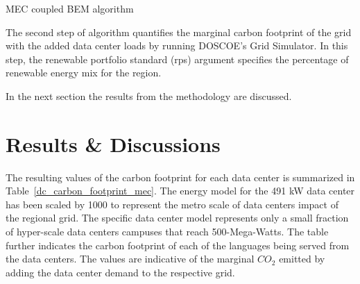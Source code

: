   \begin{algorithm}
    \begin{small}
    \caption{MEC coupled BEM algorithm}
    \label{Service Profile}
  \end{small}
  \end{algorithm}

  The second step of algorithm quantifies the marginal carbon footprint of the grid with the added data center loads by running DOSCOE’s Grid Simulator. In this step, the renewable portfolio standard (rps) argument specifies the percentage of renewable energy mix for the region.  

  In the next section the results from the methodology are discussed. 


\section{Results \& Discussions}
The resulting values of the carbon footprint for each data center is summarized in Table~\ref{dc_carbon_footprint_mec}. The energy model for the 491 kW data center has been scaled by 1000 to represent the metro scale of data centers impact of the regional grid. The specific data center model represents only a small fraction of hyper-scale data centers campuses that reach 500-Mega-Watts. The table further indicates the carbon footprint of each of the languages being served from the data centers. The values are indicative of the marginal $CO_{2}$ emitted by adding the data center demand to the respective grid.

 

